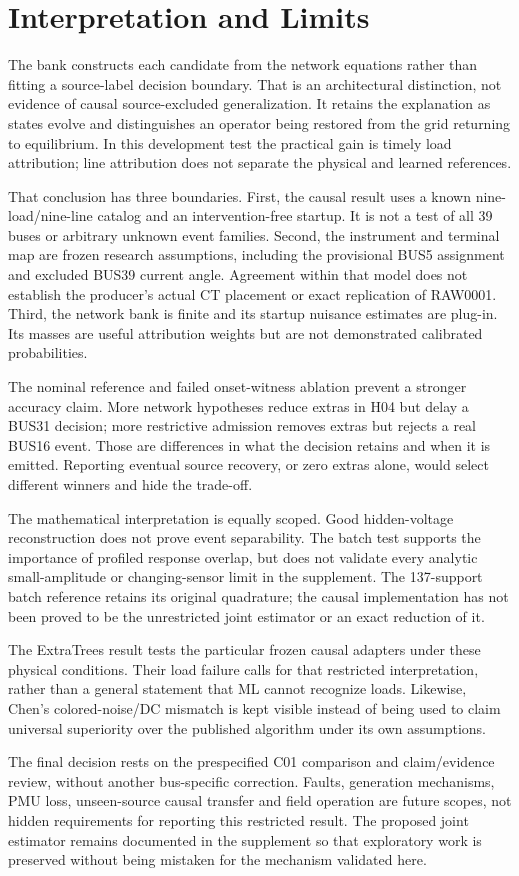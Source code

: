 \section{Interpretation and Limits}
\label{sec:discussion}

The bank constructs each candidate from the network equations rather than fitting a source-label decision boundary. That is an architectural distinction, not evidence of causal source-excluded generalization. It retains the explanation as states evolve and distinguishes an operator being restored from the grid returning to equilibrium. In this development test the practical gain is timely load attribution; line attribution does not separate the physical and learned references.

That conclusion has three boundaries. First, the causal result uses a known nine-load/nine-line catalog and an intervention-free startup. It is not a test of all 39 buses or arbitrary unknown event families. Second, the instrument and terminal map are frozen research assumptions, including the provisional BUS5 assignment and excluded BUS39 current angle. Agreement within that model does not establish the producer's actual CT placement or exact replication of RAW0001. Third, the network bank is finite and its startup nuisance estimates are plug-in. Its masses are useful attribution weights but are not demonstrated calibrated probabilities.

The nominal reference and failed onset-witness ablation prevent a stronger accuracy claim. More network hypotheses reduce extras in H04 but delay a BUS31 decision; more restrictive admission removes extras but rejects a real BUS16 event. Those are differences in what the decision retains and when it is emitted. Reporting eventual source recovery, or zero extras alone, would select different winners and hide the trade-off.

The mathematical interpretation is equally scoped. Good hidden-voltage reconstruction does not prove event separability. The batch test supports the importance of profiled response overlap, but does not validate every analytic small-amplitude or changing-sensor limit in the supplement. The 137-support batch reference retains its original quadrature; the causal implementation has not been proved to be the unrestricted joint estimator or an exact reduction of it.

The ExtraTrees result tests the particular frozen causal adapters under these physical conditions. Their load failure calls for that restricted interpretation, rather than a general statement that ML cannot recognize loads. Likewise, Chen's colored-noise/DC mismatch is kept visible instead of being used to claim universal superiority over the published algorithm under its own assumptions.

The final decision rests on the prespecified C01 comparison and claim/evidence review, without another bus-specific correction. Faults, generation mechanisms, PMU loss, unseen-source causal transfer and field operation are future scopes, not hidden requirements for reporting this restricted result. The proposed joint estimator remains documented in the supplement so that exploratory work is preserved without being mistaken for the mechanism validated here.
